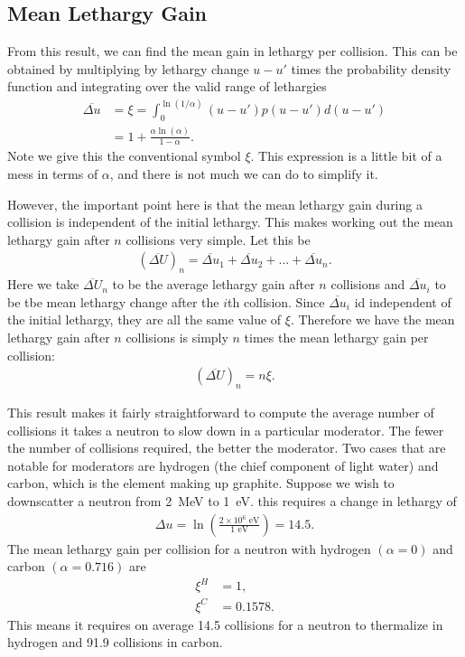 \subsection{Mean Lethargy Gain}

From this result, we can find the mean gain in lethargy per collision. This can be obtained by multiplying by lethargy change $u - u'$ times the probability density function and integrating over the valid range of lethargies
\begin{align}
  \overline{\Delta u} &= \xi = \int_0^{\ln(1/\alpha)} ( u - u' ) p( u - u' ) d( u - u' ) \nonumber \\
  &= 1 + \frac{ \alpha \ln(\alpha) }{ 1 - \alpha } .
\end{align}
Note we give this the conventional symbol $\xi$. This expression is a little bit of a mess in terms of $\alpha$, and there is not much we can do to simplify it. 

However, the important point here is that the mean lethargy gain during a collision is independent of the initial lethargy. This makes working out the mean lethargy gain after $n$ collisions very simple. Let this be
\begin{align}
  ( \overline{\Delta U} )_n = \overline{\Delta u}_1 + \overline{\Delta u}_2 + \ldots + \overline{\Delta u}_n .
\end{align}
Here we take $\overline{\Delta U}_n$ to be the average lethargy gain after $n$ collisions and $\overline{\Delta u}_i$ to be tbe mean lethargy change after the $i$th collision. Since $\overline{\Delta u}_i$ id independent of the initial lethargy, they are all the same value of $\xi$. Therefore we have the mean lethargy gain after $n$ collisions is simply $n$ times the mean lethargy gain per collision:
\begin{align}
  ( \overline{\Delta U} )_n = n \xi .
\end{align}

This result makes it fairly straightforward to compute the average number of collisions it takes a neutron to slow down in a particular moderator. The fewer the number of collisions required, the better the moderator. Two cases that are notable for moderators are hydrogen (the chief component of light water) and carbon, which is the element making up graphite. Suppose we wish to downscatter a neutron from 2~MeV to 1~eV. this requires a change in lethargy of
\begin{align}
  \Delta u = \ln\left( \frac{ 2 \times 10^6 \text{ eV} }{ 1 \text{ eV} } \right) = 14.5. \nonumber
\end{align}
The mean lethargy gain per collision for a neutron with hydrogen $(\alpha = 0)$ and carbon $(\alpha = 0.716)$ are
\begin{align}
  \xi^H &= 1, \nonumber \\
  \xi^C &= 0.1578. \nonumber
\end{align}
This means it requires on average 14.5 collisions for a neutron to thermalize in hydrogen and 91.9 collisions in carbon.

